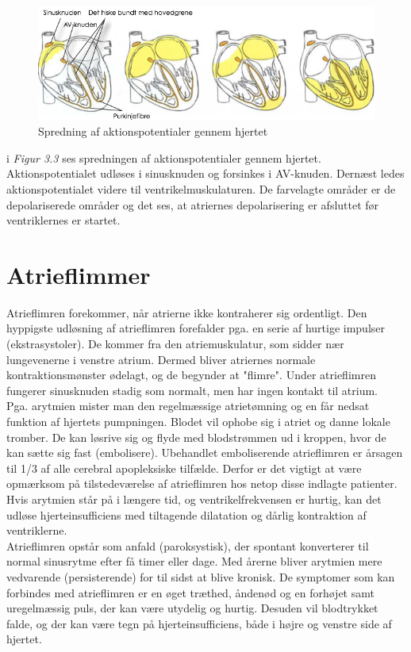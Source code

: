 \begin{figure}[htb]

	\centering	
	\includegraphics[width=1\textwidth]{Figurer/Snip20150410_6}
	\caption{Spredning af aktionspotentialer gennem hjertet \protect\footnotemark}
\end{figure}

i \textit{Figur 3.3} ses spredningen af aktionspotentialer gennem hjertet. Aktionspotentialet udløses i sinusknuden og forsinkes i AV-knuden. Dernæst ledes aktionspotentialet videre til ventrikelmuskulaturen. De farvelagte områder er de depolariserede områder og det ses, at atriernes depolarisering er afsluttet før ventriklernes er startet.

\section{Atrieflimmer}
Atrieflimren forekommer, når atrierne ikke kontraherer sig ordentligt. Den hyppigste udløsning af atrieflimren forefalder pga. en serie af hurtige impulser (ekstrasystoler).  De kommer fra den atriemuskulatur, som sidder nær lungevenerne i venstre atrium. Dermed bliver atriernes normale kontraktionsmønster ødelagt, og de begynder at "flimre". Under atrieflimren fungerer sinusknuden stadig som normalt, men har ingen kontakt til atrium.\\
Pga. arytmien mister man den regelmæssige atrietømning og en får nedsat funktion af hjertets pumpningen. Blodet vil ophobe sig i atriet og danne lokale tromber.  De kan løsrive sig og flyde med blodstrømmen ud i kroppen, hvor de kan sætte sig fast (embolisere). Ubehandlet emboliserende atrieflimren er årsagen til 1/3 af alle cerebral apopleksiske tilfælde. Derfor er det vigtigt at være opmærksom på tilstedeværelse af atrieflimren hos netop disse indlagte patienter.\\
Hvis arytmien står på i længere tid, og ventrikelfrekvensen er hurtig, kan det udløse hjerteinsufficiens med tiltagende dilatation og dårlig kontraktion af ventriklerne. \\
Atrieflimren opstår som anfald (paroksystisk), der spontant konverterer til normal sinusrytme efter få timer eller dage. Med årerne bliver arytmien mere vedvarende (persisterende) for til sidst at blive kronisk.  De symptomer som kan forbindes med atrieflimren er en øget træthed, åndenød og en forhøjet samt uregelmæssig puls, der kan være utydelig og hurtig. Desuden vil blodtrykket falde, og der kan være tegn på hjerteinsufficiens, både i højre og venstre side af hjertet. 

